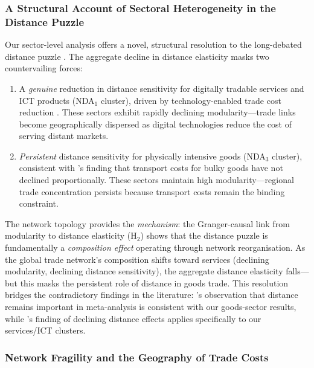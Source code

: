 \documentclass[preprint, 3p,
authoryear]{elsarticle} %
\begin{document}
\subsubsection{A Structural Account of Sectoral Heterogeneity in the
Distance Puzzle}\label{a-structural-resolution-of-the-distance-puzzle}

Our sector-level analysis offers a novel, structural resolution to the
long-debated distance puzzle
\citep{disdier2008, brun2005, yotov2012distance}. The aggregate decline
in distance elasticity masks two countervailing forces:

\begin{enumerate}
\item A \textit{genuine} reduction in distance sensitivity for digitally tradable services and ICT products (NDA$_1$ cluster), driven by technology-enabled trade cost reduction \citep{lendle2016}. These sectors exhibit rapidly declining modularity---trade links become geographically dispersed as digital technologies reduce the cost of serving distant markets.

\item \textit{Persistent} distance sensitivity for physically intensive goods (NDA$_3$ cluster), consistent with \citet{hummels2005}'s finding that transport costs for bulky goods have not declined proportionally. These sectors maintain high modularity---regional trade concentration persists because transport costs remain the binding constraint.
\end{enumerate}

The network topology provides the \textit{mechanism}: the Granger-causal
link from modularity to distance elasticity (H\(_2\)) shows that the
distance puzzle is fundamentally a \textit{composition effect} operating
through network reorganisation. As the global trade network's
composition shifts toward services (declining modularity, declining
distance sensitivity), the aggregate distance elasticity falls---but
this masks the persistent role of distance in goods trade. This
resolution bridges the contradictory findings in the literature:
\citet{disdier2008}'s observation that distance remains important in
meta-analysis is consistent with our goods-sector results, while
\citet{lendle2016}'s finding of declining distance effects applies
specifically to our services/ICT clusters.

\subsubsection{Network Fragility and the Geography of Trade
Costs}\label{network-fragility-and-the-geography-of-trade-costs}
\end{document}
